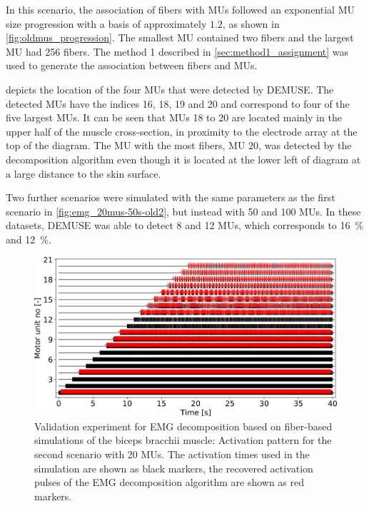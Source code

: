 In this scenario, the association of fibers with MUs followed an exponential MU size progression with a basis of approximately $1.2$, as shown in \cref{fig:oldmus_progression}. The smallest MU contained two fibers and the largest MU had 256 fibers. The method 1 described in \cref{sec:method1_assignment} was used to generate the association between fibers and MUs.

 depicts the location of the four MUs that were detected by DEMUSE. The detected MUs have the indices 16, 18, 19 and 20 and correspond to four of the five largest MUs. It can be seen that MUs 18 to 20 are located mainly in the upper half of the muscle cross-section, in proximity to the electrode array at the top of the diagram.
The MU with the most fibers, MU 20, was detected by the decomposition algorithm even though it is located at the lower left of diagram at a large distance to the skin surface.

Two further scenarios were simulated with the same parameters as the first scenario in \cref{fig:emg_20mus-50s-old2}, but instead with 50 and 100 MUs. In these datasets, DEMUSE was able to detect 8 and 12 MUs, which corresponds to \SI{16}{\percent} and \SI{12}{\percent}. 

\begin{figure}
  \centering%
  \includegraphics[width=\textwidth]{images/results/application/emg_20mus-40s_new3.png}%
  \caption{Validation experiment for EMG decomposition based on fiber-based simulations of the biceps bracchii muscle: Activation pattern for the second scenario with 20 MUs. The activation times used in the simulation are shown as black markers, the recovered activation pulses of the EMG decomposition algorithm are shown as red markers.}%
  \label{fig:emg_20mus-40s_new}%
\end{figure}

